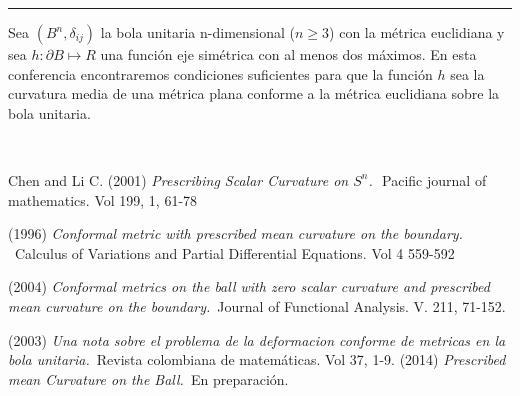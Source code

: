 \begin{titlepage}
\begin{minipage}{0.5\linewidth}
\begin{minipage}{0.45\linewidth}
    \begin{flushright}
        \printauthor
    \end{flushright}
\end{minipage} \hspace{0pt}
%
\begin{minipage}{0.02\linewidth}
      \color{ptctitle} \rule{1pt}{120pt}
\end{minipage} 
\end{minipage}
\hspace*{-4.5cm}
%
\begin{minipage}{0.85\linewidth}
\begin{minipage}{0.85\linewidth}
\footnotesize
\vspace{5pt}
    \begin{resumen} 
   Sea $(B^{n},\delta_{ij})$ la bola unitaria  n-dimensional ($n\geq 3$) con la m\'etrica euclidiana y sea $h:\partial B \mapsto R$ una funci\'on eje sim\'etrica con al menos dos m\'aximos. En esta conferencia encontraremos condiciones suficientes para que la funci\'on $h$ sea la curvatura media de una m\'etrica plana conforme a la m\'etrica euclidiana sobre la bola unitaria.
    \end{resumen}
   \end{minipage}
   \vspace{10pt}
\end{minipage}
\vspace{10pt}\\[5pt]
  \vspace{10pt}
\begin{thebibliography}{99}
 {\sc Chen and Li C.} (2001) \textsl{Prescribing Scalar Curvature on $S^{n}$.}\,\ Pacific journal of mathematics. Vol 199, 1, 61-78

(1996) \textsl{Conformal metric with prescribed mean curvature on the boundary. }\, \ Calculus of Variations and Partial Differential Equations. Vol 4 559-592

(2004) \textsl{Conformal metrics on the ball with zero scalar curvature and prescribed mean curvature on the boundary.}\ Journal of Functional Analysis. V. 211,  71-152.

 (2003) \textsl{Una nota sobre el problema de la deformacion conforme de metricas en la bola unitaria.}\ Revista colombiana de matem\'aticas. Vol 37,  1-9.
 (2014) \textsl{Prescribed mean Curvature on the Ball.}\ En preparaci\'on.
\end{thebibliography}
\end{titlepage}
